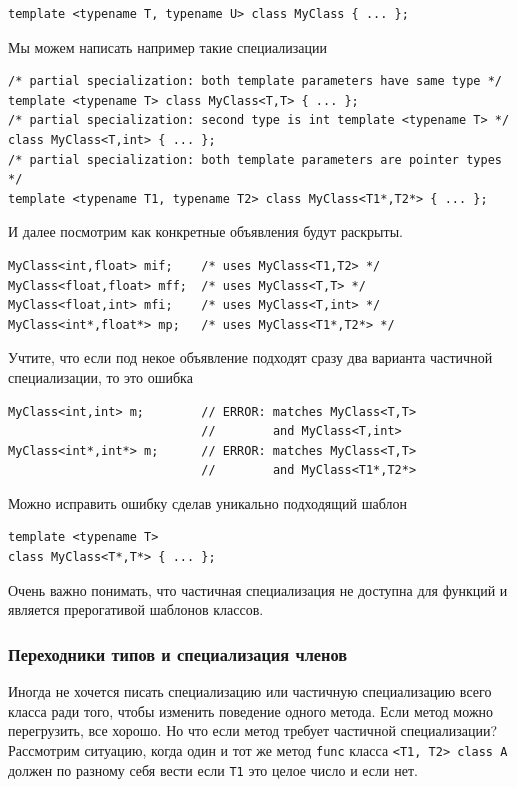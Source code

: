 \documentclass[a4paper,12pt,oneside]{article}
\begin{document}
\begin{lstlisting}
template <typename T, typename U> class MyClass { ... };
\end{lstlisting}

Мы можем написать например такие специализации

\begin{lstlisting}
/* partial specialization: both template parameters have same type */ 
template <typename T> class MyClass<T,T> { ... }; 
/* partial specialization: second type is int template <typename T> */ 
class MyClass<T,int> { ... }; 
/* partial specialization: both template parameters are pointer types */
template <typename T1, typename T2> class MyClass<T1*,T2*> { ... };
\end{lstlisting}

И далее посмотрим как конкретные объявления будут раскрыты.

\begin{lstlisting}
MyClass<int,float> mif;    /* uses MyClass<T1,T2> */ 
MyClass<float,float> mff;  /* uses MyClass<T,T> */ 
MyClass<float,int> mfi;    /* uses MyClass<T,int> */ 
MyClass<int*,float*> mp;   /* uses MyClass<T1*,T2*> */
\end{lstlisting}

Учтите, что если под некое объявление подходят сразу два варианта частичной специализации, то это ошибка

\begin{lstlisting}
MyClass<int,int> m;        // ERROR: matches MyClass<T,T> 
                           //        and MyClass<T,int> 
MyClass<int*,int*> m;      // ERROR: matches MyClass<T,T> 
                           //        and MyClass<T1*,T2*>
\end{lstlisting}

Можно исправить ошибку сделав уникально подходящий шаблон

\begin{lstlisting}
template <typename T> 
class MyClass<T*,T*> { ... };
\end{lstlisting}

Очень важно понимать, что частичная специализация не доступна для функций и является прерогативой шаблонов классов.

\subsubsection{Переходники типов и специализация членов}

Иногда не хочется писать специализацию или частичную специализацию всего класса ради того, чтобы изменить поведение одного метода. Если метод можно перегрузить, все хорошо. Но что если метод требует частичной специализации? Рассмотрим ситуацию, когда один и тот же метод \lstinline!func! класса \lstinline!<T1, T2> class A! должен по разному себя вести если \lstinline!T1! это целое число и если нет.
\end{document}
